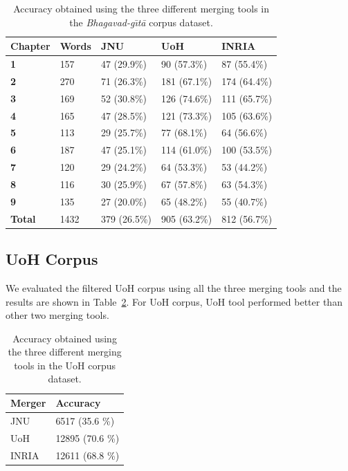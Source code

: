 \documentclass[11pt]{article}
\begin{document}
\begin{table}[h]
	\begin{center}
		\begin{tabular}{|p{1cm} | p{1cm}|p{1.2cm} | p{1.2cm} | p{1.2cm} |}
			\hline 
			\bf Chapter & \bf Words &\bf JNU & \bf UoH & \bf INRIA \\
			\hline
			
			\bf	1	&	157	&	47 (29.9\%)	&	90 (57.3\%)	&	87 (55.4\%)	\\	\hline
			\bf	2	&	270	&	71 (26.3\%)	&	181 (67.1\%)	&	174 (64.4\%)	\\	\hline
			\bf	3	&	169	&	52 (30.8\%)	&	126 (74.6\%)	&	111	(65.7\%)	\\	\hline
			\bf	4	&	165	&	47 (28.5\%)	&	121 (73.3\%)	&	105	(63.6\%)	\\	\hline
			\bf	5	&	113	&	29 (25.7\%)	&	77 (68.1\%)	&	64	(56.6\%)	\\	\hline
			\bf	6	&	187	&	47 (25.1\%)	&	114 (61.0\%)	&	100	(53.5\%)	\\	\hline
			\bf	7	&	120	&	29 (24.2\%)	&	64	(53.3\%)	&	53	(44.2\%)	\\	\hline
			\bf	8	&	116	&	30 (25.9\%)	&	67	(57.8\%)	&	63	(54.3\%)	\\	\hline
			\bf	9	&	135	&	27 (20.0\%)	&	65	(48.2\%)	&	55	(40.7\%)	\\	\hline
			\bf	Total	&	1432	&	379 (26.5\%)	&	905	(63.2\%)	&	812	(56.7\%)	\\	\hline
		\end{tabular}
	\end{center}
	\caption{\label{ev_bg_me} Accuracy obtained using the three different merging tools in the \textit{Bhagavad-g\={\i}t\={a}} corpus dataset.}
\end{table}

\subsection{UoH Corpus}
We evaluated the filtered UoH corpus using all the three merging tools and the results are shown in Table~\ref{ev_uo_me}. For UoH corpus,  UoH tool performed better than other two merging tools. 

\begin{table}[h]
	\begin{center}
		\begin{tabular}{|l|l| }
			\hline  \bf Merger & \bf Accuracy\\
			\hline
			JNU & 6517 (35.6 \%) \\ \hline
			UoH & 12895 (70.6 \%) \\ \hline
			INRIA & 12611 (68.8 \%)\\ \hline

		\end{tabular}
	\end{center}
	\caption{\label{ev_uo_me} Accuracy obtained using the three different merging tools in the UoH corpus dataset.}
\end{table}
\end{document}
